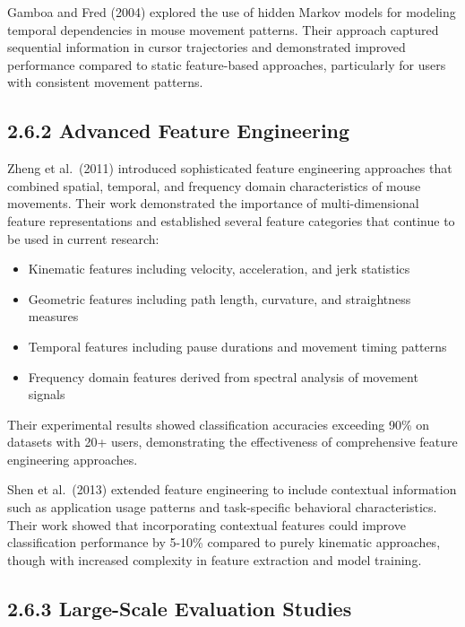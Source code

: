 \documentclass[
  12pt,
  a4paper,
]{report}
\providecommand{\tightlist}{%
  \setlength{\itemsep}{0pt}\setlength{\parskip}{0pt}}
\begin{document}
Gamboa and Fred (2004) explored the use of hidden Markov models for
modeling temporal dependencies in mouse movement patterns. Their
approach captured sequential information in cursor trajectories and
demonstrated improved performance compared to static feature-based
approaches, particularly for users with consistent movement patterns.

\subsection{2.6.2 Advanced Feature
Engineering}\label{advanced-feature-engineering}

Zheng et al.~(2011) introduced sophisticated feature engineering
approaches that combined spatial, temporal, and frequency domain
characteristics of mouse movements. Their work demonstrated the
importance of multi-dimensional feature representations and established
several feature categories that continue to be used in current research:

\begin{itemize}
\tightlist
\item
  Kinematic features including velocity, acceleration, and jerk
  statistics
\item
  Geometric features including path length, curvature, and straightness
  measures
\item
  Temporal features including pause durations and movement timing
  patterns
\item
  Frequency domain features derived from spectral analysis of movement
  signals
\end{itemize}

Their experimental results showed classification accuracies exceeding
90\% on datasets with 20+ users, demonstrating the effectiveness of
comprehensive feature engineering approaches.

Shen et al.~(2013) extended feature engineering to include contextual
information such as application usage patterns and task-specific
behavioral characteristics. Their work showed that incorporating
contextual features could improve classification performance by 5-10\%
compared to purely kinematic approaches, though with increased
complexity in feature extraction and model training.

\subsection{2.6.3 Large-Scale Evaluation
Studies}\label{large-scale-evaluation-studies}
\end{document}
